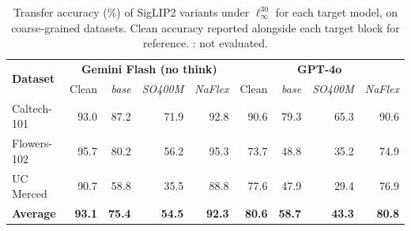 \begin{table}[t]
\centering
\setlength{\tabcolsep}{5pt}
\renewcommand{\arraystretch}{1.08}
\small
\caption{%
  Transfer accuracy (\%) of SigLIP2 variants under $\ell_\infty^{30}$
  for each target model, on coarse-grained datasets.
  Clean accuracy reported alongside each target block for reference.
  {\textemdash}: not evaluated.
}
\label{tab:siglip2_linf30}
\begin{tabular}{l || r | rrr || r | rrr}
\toprule
\multirow{2}{*}{\textbf{Dataset}} & \multicolumn{4}{c||}{\textbf{Gemini Flash (no think)}} & \multicolumn{4}{c}{\textbf{GPT-4o}} \\
 & Clean & \textit{base} & \textit{SO400M} & \textit{NaFlex} & Clean & \textit{base} & \textit{SO400M} & \textit{NaFlex} \\
\midrule
Caltech-101 & 93.0 & 87.2 & 71.9 & 92.8 & 90.6 & 79.3 & 65.3 & 90.6 \\
Flowers-102 & 95.7 & 80.2 & 56.2 & 95.3 & 73.7 & 48.8 & 35.2 & 74.9 \\
UC Merced & 90.7 & 58.8 & 35.5 & 88.8 & 77.6 & 47.9 & 29.4 & 76.9 \\
\midrule
\textbf{Average} & \textbf{93.1} & \textbf{75.4} & \textbf{54.5} & \textbf{92.3} & \textbf{80.6} & \textbf{58.7} & \textbf{43.3} & \textbf{80.8} \\
\bottomrule
\end{tabular}
\end{table}